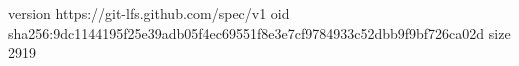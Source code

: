 version https://git-lfs.github.com/spec/v1
oid sha256:9dc1144195f25e39adb05f4ec69551f8e3e7cf9784933c52dbb9f9bf726ca02d
size 2919

